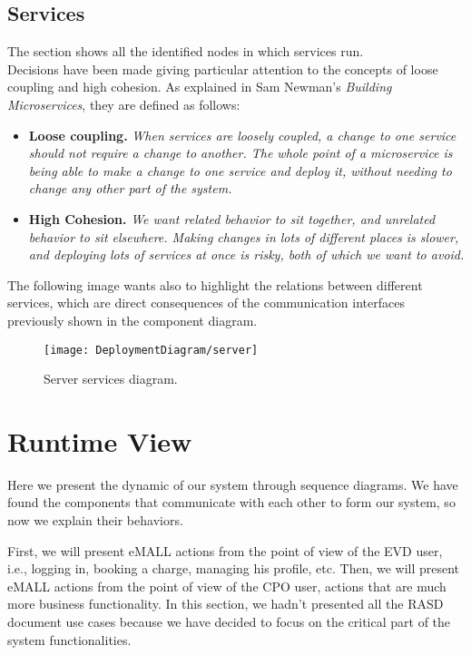 \subsection{Services}
\label{subsec:services}%
The section shows all the identified nodes in which services run. \\
Decisions have been made giving particular attention to the concepts of loose coupling and high cohesion.
As explained in Sam Newman's \textit{Building Microservices}, they are defined as follows:
\begin{itemize}
    \item \textbf{Loose coupling.} \textit{When services are loosely coupled, a change to one service should not require a change to another.
    The whole point of a microservice is being able to make a change to one service and deploy it,
        without needing to change any other part of the system.}
    \item \textbf{High Cohesion.} \textit{We want related behavior to sit together, and unrelated behavior to sit elsewhere.
    Making changes in lots of different places is slower, and deploying lots of services at once is risky, both of which we want to avoid.}
\end{itemize}
The following image wants also to highlight the relations between different services, which are direct consequences of the
communication interfaces previously shown in the component diagram.
\begin{figure} [H]
    \begin{center}
        \texttt{[image: DeploymentDiagram/server]}
        \caption{Server services diagram.}
        \label{fig: services}
    \end{center}
\end{figure}


\section{Runtime View}
\label{sec:runtime_view}%
Here we present the dynamic of our system through sequence diagrams.
We have found the components that communicate with each other to form our system, so now we explain their behaviors.

First, we will present eMALL actions from the point of view of the EVD user, i.e., logging in, booking a charge, managing his profile, etc.
Then, we will present eMALL actions from the point of view of the CPO user, actions that are much more business functionality.
In this section, we hadn't presented all the RASD document use cases because we have decided to focus on the critical part of the system functionalities.

